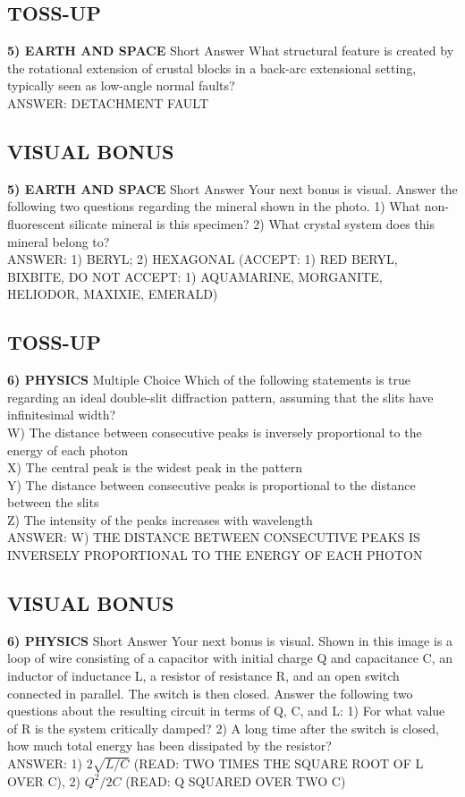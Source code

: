 \documentclass{article}
\begin{document}
\subsection*{TOSS-UP}
\textbf{5) EARTH AND SPACE} Short Answer What structural feature is created by the rotational extension of crustal blocks in a back-arc extensional setting, typically seen as low-angle normal faults?
\\ANSWER: DETACHMENT FAULT

\subsection*{VISUAL BONUS}
\textbf{5) EARTH AND SPACE} Short Answer Your next bonus is visual. Answer the following two questions regarding the mineral shown in the photo. 1) What non-fluorescent silicate mineral is this specimen? 2) What crystal system does this mineral belong to?
\\ANSWER: 1) BERYL; 2) HEXAGONAL (ACCEPT: 1) RED BERYL, BIXBITE, DO NOT ACCEPT: 1) AQUAMARINE, MORGANITE, HELIODOR, MAXIXIE, EMERALD)

\subsection*{TOSS-UP}
\textbf{6) PHYSICS} Multiple Choice Which of the following statements is true regarding an ideal double-slit diffraction pattern, assuming that the slits have infinitesimal width?
\\W) The distance between consecutive peaks is inversely proportional to the energy of each photon
\\X) The central peak is the widest peak in the pattern
\\Y) The distance between consecutive peaks is proportional to the distance between the slits
\\Z) The intensity of the peaks increases with wavelength
\\ANSWER: W) THE DISTANCE BETWEEN CONSECUTIVE PEAKS IS INVERSELY PROPORTIONAL TO THE ENERGY OF EACH PHOTON

\subsection*{VISUAL BONUS}
\textbf{6) PHYSICS} Short Answer Your next bonus is visual. Shown in this image is a loop of wire consisting of a capacitor with initial charge Q and capacitance C, an inductor of inductance L, a resistor of resistance R, and an open switch connected in parallel. The switch is then closed. Answer the following two questions about the resulting circuit in terms of Q, C, and L: 1) For what value of R is the system critically damped? 2) A long time after the switch is closed, how much total energy has been dissipated by the resistor?
\\ANSWER: 1) $2\sqrt{L/C}$ (READ: TWO TIMES THE SQUARE ROOT OF L OVER C), 2) $Q^{2}/2C$ (READ: Q SQUARED OVER TWO C)
\end{document}
